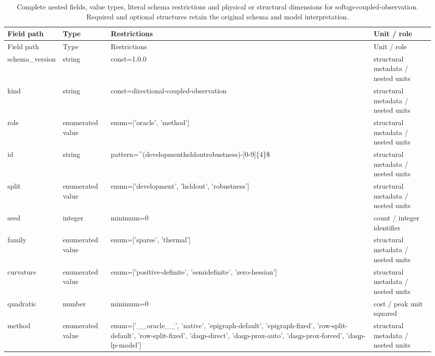 \begingroup\footnotesize\setlength{\tabcolsep}{3pt}
\begin{longtable}{@{}>{\raggedright\arraybackslash}p{}>{\raggedright\arraybackslash}p{}>{\raggedright\arraybackslash}p{}>{\raggedright\arraybackslash}p{}@{}}
\caption{Complete nested fields, value types, literal schema restrictions and physical or structural dimensions for softqp-coupled-observation. Required and optional structures retain the original schema and model interpretation.}\label{tab:nested-softqp-coupled-observation}\\
\toprule Field path & Type & Restrictions & Unit / role\\\midrule\endfirsthead
\toprule Field path & Type & Restrictions & Unit / role\\\midrule\endhead
\bottomrule\endfoot
schema\_\allowbreak{}version & string & const=\allowbreak{}1.\allowbreak{}0.\allowbreak{}0 & structural metadata /\allowbreak{} nested units\\
kind & string & const=\allowbreak{}directional-\allowbreak{}coupled-\allowbreak{}observation & structural metadata /\allowbreak{} nested units\\
role & enumerated value & enum=\allowbreak{}['oracle', 'method'] & structural metadata /\allowbreak{} nested units\\
id & string & pattern=\allowbreak{}\textasciicircum{}(development\textbar{}\allowbreak{}heldout\textbar{}\allowbreak{}robustness)-[0-9]\{4\}\$ & structural metadata /\allowbreak{} nested units\\
split & enumerated value & enum=\allowbreak{}['development', 'heldout', 'robustness'] & structural metadata /\allowbreak{} nested units\\
seed & integer & minimum=\allowbreak{}0 & count /\allowbreak{} integer identifier\\
family & enumerated value & enum=\allowbreak{}['sparse', 'thermal'] & structural metadata /\allowbreak{} nested units\\
curvature & enumerated value & enum=\allowbreak{}['positive-\allowbreak{}definite', 'semidefinite', 'zero-\allowbreak{}hessian'] & structural metadata /\allowbreak{} nested units\\
quadratic & number & minimum=\allowbreak{}0 & cost /\allowbreak{} peak unit squared\\
method & enumerated value & enum=\allowbreak{}['\_\allowbreak{}\_\allowbreak{}oracle\_\allowbreak{}\_\allowbreak{}', 'native', 'epigraph-\allowbreak{}default', 'epigraph-\allowbreak{}fixed', 'row-\allowbreak{}split-\allowbreak{}default', 'row-\allowbreak{}split-\allowbreak{}fixed', 'daqp-\allowbreak{}direct', 'daqp-\allowbreak{}prox-\allowbreak{}auto', 'daqp-\allowbreak{}prox-\allowbreak{}forced', 'daqp-\allowbreak{}lp-\allowbreak{}model'] & structural metadata /\allowbreak{} nested units\\

\end{longtable}
